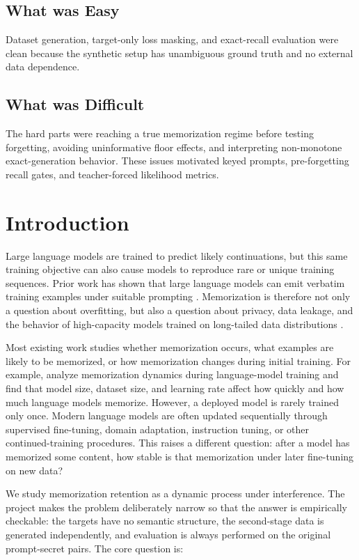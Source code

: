 \documentclass{article}
\begin{document}
\subsection*{What was Easy}
Dataset generation, target-only loss masking, and exact-recall evaluation were clean because the synthetic setup has unambiguous ground truth and no external data dependence.

\subsection*{What was Difficult}
The hard parts were reaching a true memorization regime before testing forgetting, avoiding uninformative floor effects, and interpreting non-monotone exact-generation behavior. These issues motivated keyed prompts, pre-forgetting recall gates, and teacher-forced likelihood metrics.

\clearpage

\section{Introduction}

Large language models are trained to predict likely continuations, but this same training objective can also cause models to reproduce rare or unique training sequences. Prior work has shown that large language models can emit verbatim training examples under suitable prompting \citep{carlini2021extracting}. Memorization is therefore not only a question about overfitting, but also a question about privacy, data leakage, and the behavior of high-capacity models trained on long-tailed data distributions \citep{feldman2020does}.

Most existing work studies whether memorization occurs, what examples are likely to be memorized, or how memorization changes during initial training. For example, \citet{tirumala2022memorization} analyze memorization dynamics during language-model training and find that model size, dataset size, and learning rate affect how quickly and how much language models memorize. However, a deployed model is rarely trained only once. Modern language models are often updated sequentially through supervised fine-tuning, domain adaptation, instruction tuning, or other continued-training procedures. This raises a different question: after a model has memorized some content, how stable is that memorization under later fine-tuning on new data?

We study memorization retention as a dynamic process under interference. The project makes the problem deliberately narrow so that the answer is empirically checkable: the targets have no semantic structure, the second-stage data is generated independently, and evaluation is always performed on the original prompt-secret pairs. The core question is:
\end{document}
